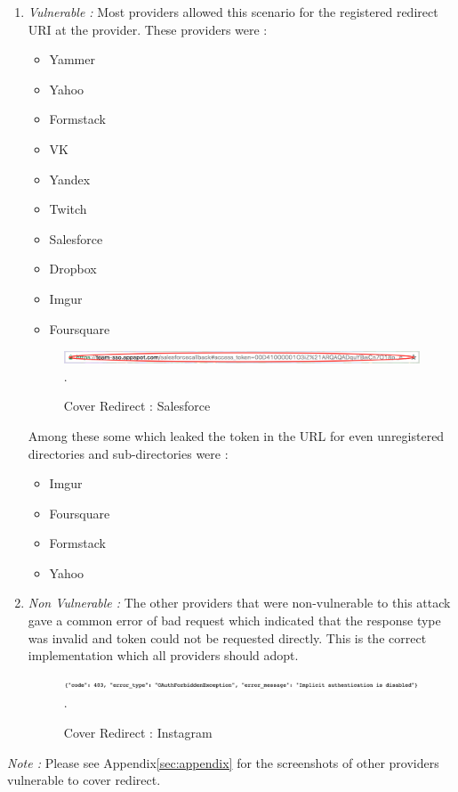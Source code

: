 \begin{enumerate}[label=(\Alph*)]
\item \textit{Vulnerable :} Most providers allowed this scenario for the registered redirect URI at the provider. These providers were :
\begin{itemize}
\item Yammer
\item Yahoo
\item Formstack 
\item VK
\item Yandex
\item Twitch
\item Salesforce
\item Dropbox
\item Imgur
\item Foursquare
\end{itemize}

\begin{figure}[t]
   		 \centering
   		 \includegraphics[width=\columnwidth]{figures/salesforce1.png}.
   		 \caption{Cover Redirect : Salesforce }
   		 \label{fig:salesredir}
\end{figure}

Among these some which leaked the token in the URL for even unregistered directories and sub-directories were :
\begin{itemize}
\item Imgur
\item Foursquare
\item Formstack
\item Yahoo
\end{itemize}

\item \textit{Non Vulnerable :} The other providers that were non-vulnerable to this attack gave a common error of bad request which indicated that the response type was invalid and token could not be requested directly. This is the correct implementation which all providers should adopt.

\begin{figure}[t]
   		 \centering
   		 \includegraphics[width=\columnwidth]{figures/instagram.png}.
   		 \caption{Cover Redirect : Instagram }
   		 \label{fig:instaredir}
\end{figure}

\end{enumerate}
\textit{Note :} Please see Appendix\ref{sec:appendix} for the screenshots of other providers vulnerable to cover redirect.

